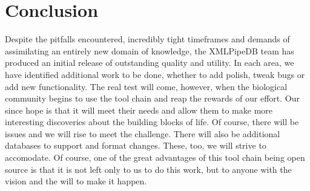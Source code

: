 \documentclass[11pt]{article}
\begin{document}
\section{Conclusion}
Despite the pitfalls encountered, incredibly tight timeframes and demands of assimilating an entirely new domain of knowledge, the XMLPipeDB team has produced an initial release of outstanding quality and utility. In each area, we have identified additional work to be done, whether to add polish, tweak bugs or add new functionality. The real test will come, however, when the biological community begins to use the tool chain and reap the rewards of our effort. Our since hope is that it will meet their needs and allow them to make more interesting discoveries about the building blocks of life. Of course, there will be issues and we will rise to meet the challenge. There will also be additional databases to support and format changes. These, too, we will strive to accomodate. Of course, one of the great advantages of this tool chain being open source is that it is not left only to us to do this work, but to anyone with the vision and the will to make it happen.



\pagebreak


\end{document}
